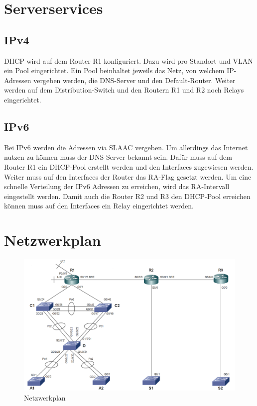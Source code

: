 \documentclass[11pt,a4paper]{scrreprt}
\begin{document}
\newpage
\section{Serverservices}
\subsection{IPv4}
\acs{DHCP} wird auf dem Router R1 konfiguriert. Dazu wird pro Standort und \acs{VLAN} ein Pool eingerichtet. Ein Pool beinhaltet jeweils das Netz, von welchem IP-Adressen vergeben werden, die \acs{DNS}-Server und den Default-Router. Weiter werden auf dem Distribution-Switch und den Routern R1 und R2 noch Relays eingerichtet.
\subsection{IPv6}
Bei IPv6 werden die Adressen via \acs{SLAAC} vergeben. Um allerdings das Internet nutzen zu können muss der \acs{DNS}-Server bekannt sein. Dafür muss auf dem Router R1 ein \acs{DHCP}-Pool erstellt werden und den Interfaces zugewiesen werden. Weiter muss auf den Interfaces der Router das \acs{RA}-Flag gesetzt werden. Um eine schnelle Verteilung der IPv6 Adressen 
zu erreichen, wird das \acs{RA}-Intervall eingestellt werden. Damit auch die Router R2 und R3 den \acs{DHCP}-Pool erreichen können muss auf den Interfaces ein Relay eingerichtet werden.
\section{Netzwerkplan}

\begin{figure} [H]
\centering
\includegraphics[angle=0,scale=0.43]{Netzwerkplan}
\caption{Netzwerkplan}
\label{abb: Netzwerkplan}
\end{figure}
\newpage
\end{document}
